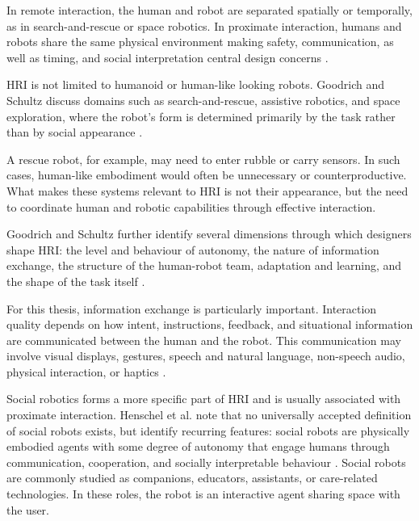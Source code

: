 In remote interaction, the human and robot are separated spatially or temporally, as in search-and-rescue or space robotics. In proximate interaction, humans and robots share the same physical environment making safety, communication, as well as timing, and social interpretation central design concerns \cite[213--215]{goodrich_human-robot_2007}.

HRI is not limited to humanoid or human-like looking robots. Goodrich and Schultz discuss domains such as search-and-rescue, assistive robotics, and space exploration, where the robot's form is determined primarily by the task rather than by social appearance \cite[213--215]{goodrich_human-robot_2007}.

A rescue robot, for example, may need to enter rubble or carry sensors. In such cases, human-like embodiment would often be unnecessary or counterproductive. What makes these systems relevant to HRI is not their appearance, but the need to coordinate human and robotic capabilities through effective interaction.

Goodrich and Schultz further identify several dimensions through which designers shape HRI: the level and behaviour of autonomy, the nature of information exchange, the structure of the human-robot team, adaptation and learning, and the shape of the task itself \cite[216--230]{goodrich_human-robot_2007}.

For this thesis, information exchange is particularly important. Interaction quality depends on how intent, instructions, feedback, and situational information are communicated between the human and the robot. This communication may involve visual displays, gestures, speech and natural language, non-speech audio, physical interaction, or haptics \cite[221]{goodrich_human-robot_2007}. %

Social robotics forms a more specific part of HRI and is usually associated with proximate interaction. Henschel et al. note that no universally accepted definition of social robots exists, but identify recurring features: social robots are physically embodied agents with some degree of autonomy that engage humans through communication, cooperation, and socially interpretable behaviour \cite[11--12]{henschel_what_2021}. Social robots are commonly studied as companions, educators, assistants, or care-related technologies. In these roles, the robot is an interactive agent sharing space with the user.


